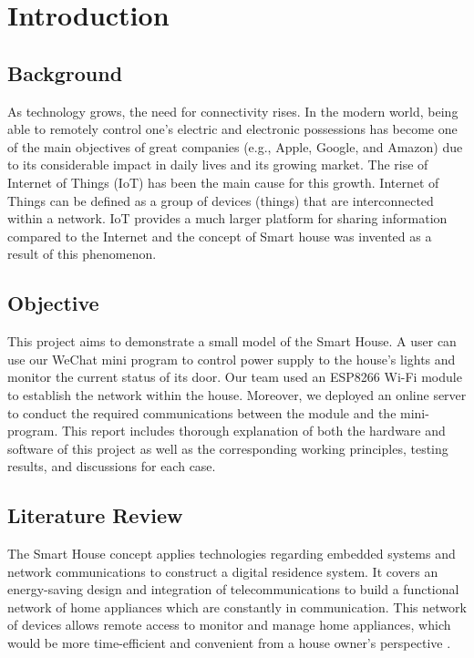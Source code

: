 \documentclass[12pt,a4paper]{report}
\begin{document}
\tableofcontents


\quad 
\setcounter{page}{1}
\chapter{Introduction}
\section{Background}
As technology grows, the need for connectivity rises. In the modern world, being able to remotely control one's electric and electronic possessions has become one of the main objectives of great companies (e.g., Apple, Google, and Amazon) due to its considerable impact in daily lives and its growing market. The rise of Internet of Things (IoT) has been the main cause for this growth. Internet of Things can be defined as a group of devices (things) that are interconnected within a network\cite{IOT}. IoT provides a much larger platform for sharing information compared to the Internet and the concept of Smart house was invented as a result of this phenomenon\cite{SmartHouse}. 
 
\section{Objective}
This project aims to demonstrate a small model of the Smart House. A user can use our WeChat mini program to control power supply to the house's lights and monitor the current status of its door. Our team used an ESP8266 Wi-Fi module to establish the network within the house. Moreover, we deployed an online server to conduct the required communications between the module and the mini-program. This report includes thorough explanation of both the hardware and software of this project as well as the corresponding working principles, testing results, and discussions for each case. 

\section{Literature Review}
The Smart House concept applies technologies regarding embedded systems and network communications to construct a digital residence system. It covers an energy-saving design and integration of telecommunications to build a functional network of home appliances which are constantly in communication. This network of devices allows remote access to monitor and manage home appliances, which would be more time-efficient and convenient from a house owner’s perspective \cite{lolz}. 
\end{document}
